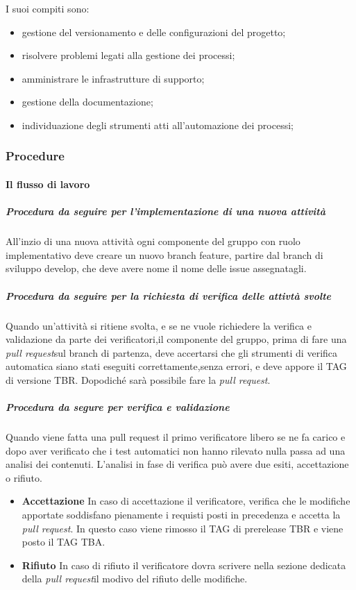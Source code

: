    			I suoi compiti sono:
   			\begin{itemize}
   				\item gestione del versionamento e delle configurazioni del progetto;
   				\item risolvere problemi legati alla gestione dei processi;
   				\item amministrare le infrastrutture di supporto;
   				\item gestione della documentazione;
   				\item individuazione degli strumenti atti all'automazione dei processi;
   			\end{itemize}
   		\subsubsection{Procedure}
				\paragraph{Il flusso di lavoro}

				\subparagraph{Procedura da seguire per l'implementazione di una nuova attività}
				All'inzio di una nuova attività ogni componente del gruppo con ruolo implementativo
				deve creare un nuovo branch feature, partire dal branch di sviluppo develop,
				che deve avere nome il nome delle issue assegnatagli.

				\subparagraph{Procedura da seguire per la richiesta di verifica delle attivtà svolte}
				Quando un'attività si ritiene svolta, e se ne vuole richiedere la verifica
				e validazione da parte dei verificatori,il componente del gruppo, prima
				di fare una \textit{pull request}\glo sul branch di partenza, deve accertarsi che gli
				strumenti di verifica automatica siano stati eseguiti correttamente,senza
				errori, e deve appore il TAG di versione TBR.
				Dopodiché sarà possibile fare la \textit{pull request}\glos.

				\subparagraph{Procedura da segure per verifica e validazione}
				Quando viene fatta una pull request il primo verificatore libero se ne fa
				carico e dopo aver verificato che i test automatici non hanno rilevato nulla
				passa ad una analisi dei contenuti.
				L'analisi in fase di verifica può avere due esiti, accettazione o rifiuto.
				\begin{itemize}
					\item \textbf{Accettazione}
				In caso di accettazione il verificatore, verifica che le modifiche apportate
				soddisfano pienamente i requisti posti in precedenza e accetta la \textit{pull request}\glos.
				In questo caso viene rimosso il TAG di prerelease TBR e viene posto il TAG
				TBA.
					\item \textbf{Rifiuto}
				In caso di rifiuto il verificatore dovra scrivere nella sezione dedicata della
				\textit{pull request}\glo il modivo del rifiuto delle modifiche.
					\end{itemize}

